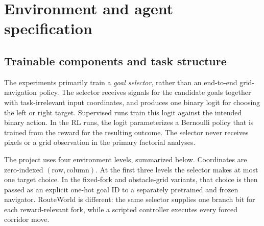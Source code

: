 \section{Environment and agent specification}
\label{sec:environment-specification}

\subsection{Trainable components and task structure}

The experiments primarily train a \emph{goal selector}, rather than an end-to-end grid-navigation policy. The selector receives signals for the candidate goals together with task-irrelevant input coordinates, and produces one binary logit for choosing the left or right target. Supervised runs train this logit against the intended binary action. In the RL runs, the logit parameterizes a Bernoulli policy that is trained from the reward for the resulting outcome. The selector never receives pixels or a grid observation in the primary factorial analyses.

The project uses four environment levels, summarized below. Coordinates are zero-indexed $(\text{row},\text{column})$. At the first three levels the selector makes at most one target choice. In the fixed-fork and obstacle-grid variants, that choice is then passed as an explicit one-hot goal ID to a separately pretrained and frozen navigator. RouteWorld is different: the same selector supplies one branch bit for each reward-relevant fork, while a scripted controller executes every forced corridor move.

